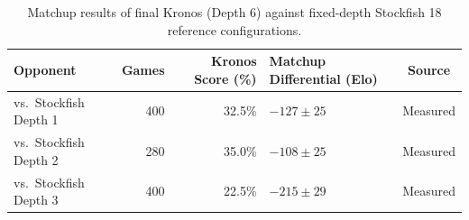 \begin{table}[htbp]
\centering
\caption[Stockfish Calibration Results]{Matchup results of final Kronos (Depth 6) against fixed-depth Stockfish 18 reference configurations.}
\label{tab:stockfish_calibration}
\begin{tabularx}{\textwidth}{Xrr X c}
\toprule
\textbf{Opponent} & \textbf{Games} & \textbf{Kronos Score (\%)} & \textbf{Matchup Differential (Elo)} & \textbf{Source} \\
\midrule
vs.\ Stockfish Depth 1 & 400  & 32.5\% & $-127 \pm 25$ & Measured \\
vs.\ Stockfish Depth 2 & 280  & 35.0\% & $-108 \pm 25$ & Measured \\
vs.\ Stockfish Depth 3 & 400  & 22.5\% & $-215 \pm 29$ & Measured \\
\bottomrule
\end{tabularx}
\end{table}


